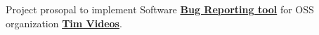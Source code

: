 \documentclass[]{deedy-resume-openfont}
\begin{document}
\begin{minipage}[t]{0.66\textwidth}
\begin{tightemize}
\item Project prosopal to implement Software \href{http://swlogs.me/blog/gsoc-2013/}{\textbf{Bug Reporting tool}} for OSS organization \href{http://code.timvideos.us/home/}{\textbf{Tim Videos}}.
\end{tightemize}
\sectionsep
%


\end{minipage}
\end{document}
